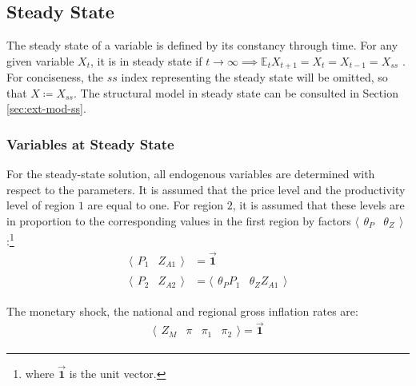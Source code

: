 \documentclass[../thesis.tex]{subfiles}
\begin{document}
\newpage


\subsection{Steady State}

The steady state of a variable is defined by its constancy through time. For any given variable $X_t$, it is in steady state if $t \to \infty \implies \mathbb{E}_t X_{t+1} = X_t = X_{t-1} = X_{ss}$ \cite[p.41]{costa_junior_understanding_2016}. For conciseness, the $ss$ index representing the steady state will be omitted, so that $X \coloneq X_{ss}$. The structural model in steady state can be consulted in Section \eqref{sec:ext-mod-ss}.


\subsubsection{Variables at Steady State}

	For the steady-state solution, all endogenous variables are determined with respect to the parameters. It is assumed that the price level and the productivity level of region $1$ are equal to one. For region $2$, it is assumed that these levels are in proportion to the corresponding values in the first region by factors $\langle \begin{matrix} \theta_{P} & \theta_{Z} \end{matrix} \rangle$:\footnote{where $\vec{\bm{1}}$ is the unit vector.}
	\begin{align}
		\langle \begin{matrix} P_{1} & Z_{A1} \end{matrix} \rangle &= \vec{\bm{1}} \label{eq_v2:reg-ss-p1-za1} 
		\\ 
		\langle \begin{matrix} P_{2} & Z_{A2} \end{matrix} \rangle &= \langle \begin{matrix} \theta_{P} P_{1} & \theta_{Z} Z_{A1} \end{matrix} \rangle \label{eq_v2:reg-ss-p2-za2}
	\end{align}
	
	The monetary shock, the national and regional gross inflation rates are:
	\begin{align}
		\langle \begin{matrix} Z_{M} & \pi & \pi_{1} & \pi_{2} \end{matrix} \rangle  = \vec{\bm{1}} \label{eq_v2:reg-ss-zm-pi}
	\end{align}
	
\end{document}

